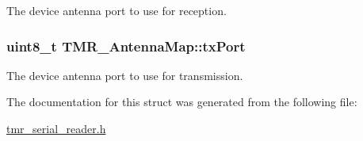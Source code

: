 The device antenna port to use for reception. \hypertarget{struct_t_m_r___antenna_map_a10986aa7c5201a3c9414cac521a18c8}{
\subsubsection[{txPort}]{\setlength{\rightskip}{0pt plus 5cm}uint8\_\-t {\bf TMR\_\-AntennaMap::txPort}}}
\label{struct_t_m_r___antenna_map_a10986aa7c5201a3c9414cac521a18c8}


The device antenna port to use for transmission. 

The documentation for this struct was generated from the following file:\begin{CompactItemize}
\item 
\hyperlink{tmr__serial__reader_8h}{tmr\_\-serial\_\-reader.h}\end{CompactItemize}
